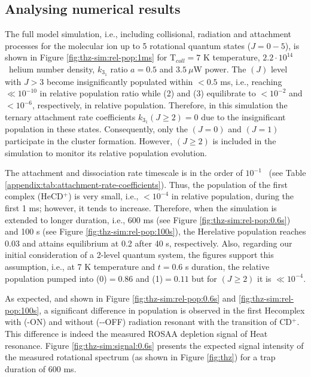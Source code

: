 \subsection{Analysing numerical results}
\label{subsec:CD+-kinetics-simulation-analysis}

The full model simulation, i.e., including collisional, radiation and
attachment processes for the \CD molecular ion up to 5 rotational quantum states
($J=0-5$), is shown in Figure \ref{fig:thz-sim:rel-pop:1ms} for T$_{coll}=7$ K
temperature, $2.2 \cdot 10^{14}$ \percc\ helium number density, $k_{3_1}$
ratio $a=0.5$ and $3.5\ \mu$W power.
The \CD$(J)$ level with $J>3$ become insignificantly populated within $<0.5$ ms, i.e.,
reaching $\ll 10^{-10}$ in relative population ratio while \CD(2) and \CD(3)
equilibrate to $<10^{-2}$ and $<10^{-6}$, respectively, in relative population. 
Therefore, in this simulation the ternary attachment rate coefficients $k_{3_1}(J\geq 2)=0$
due to the insignificant population in these states. Consequently, only the
\CD$(J=0)$ and \CD$(J=1)$ participate in the cluster formation. However, 
\CD$(J \geq 2)$ is included in the simulation to monitor its relative
population evolution.

% 


The attachment and dissociation rate timescale is in the order of $10^{-1}$
\pers\ (see Table \ref{appendix:tab:attachment-rate-coefficients}). Thus, the
population of the first complex (HeCD$^+$) is very small, i.e., $<10^{-4}$ in relative
population, during the first 1 ms; however, it tends to increase. Therefore,
when the simulation is extended to longer duration, i.e., 600 ms (see
Figure \ref{fig:thz-sim:rel-pop:0.6s}) and 100 s (see Figure
\ref{fig:thz-sim:rel-pop:100s}), the He\CD relative population reaches 0.03 and
attains equilibrium at 0.2 after 40 s, respectively. Also, regarding our initial
consideration of a 2-level quantum system, the figures
support this assumption, i.e., at 7 K temperature and $t=0.6$ s duration, 
the relative population pumped into \CD(0)$=0.86$ and \CD(1)$=0.11$ 
but for \CD$(J\geq 2)$ it is $\ll 10^{-4}$.

As expected, and shown in Figure \ref{fig:thz-sim:rel-pop:0.6s} and
\ref{fig:thz-sim:rel-pop:100s}, a significant difference in population is
observed in the first He\CD complex with (-ON) and without (-\--OFF) radiation resonant 
with the \CDline transition of CD$^+$. This difference is indeed the measured ROSAA 
depletion signal of He\CD at resonance. Figure \ref{fig:thz-sim:signal:0.6s} presents 
the expected signal intensity of the measured rotational spectrum (as shown in Figure \ref{fig:thz}) 
for a trap duration of 600 ms.

